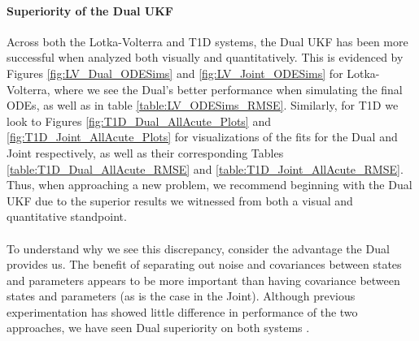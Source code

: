 \documentclass{article}
\begin{document}
\paragraph{Superiority of the Dual UKF}
Across both the Lotka-Volterra and T1D systems, the Dual UKF has been more successful when analyzed both visually and quantitatively. This is evidenced by Figures \ref{fig:LV_Dual_ODESims} and \ref{fig:LV_Joint_ODESims} for Lotka-Volterra, where we see the Dual's better performance when simulating the final ODEs, as well as in table \ref{table:LV_ODESims_RMSE}. Similarly, for T1D we look to Figures \ref{fig:T1D_Dual_AllAcute_Plots} and \ref{fig:T1D_Joint_AllAcute_Plots} for visualizations of the fits for the Dual and Joint respectively, as well as their corresponding Tables \ref{table:T1D_Dual_AllAcute_RMSE} and \ref{table:T1D_Joint_AllAcute_RMSE}. Thus, when approaching a new problem, we recommend beginning with the Dual UKF due to the superior results we witnessed from both a visual and quantitative standpoint. \\
\\
To understand why we see this discrepancy, consider the advantage the Dual provides us. The benefit of separating out noise and covariances between states and parameters appears to be more important than having covariance between states and parameters (as is the case in the Joint). Although previous experimentation has showed little difference in performance of the two approaches, we have seen Dual superiority on both systems \cite{GoveHollingerDual}.
\end{document}
